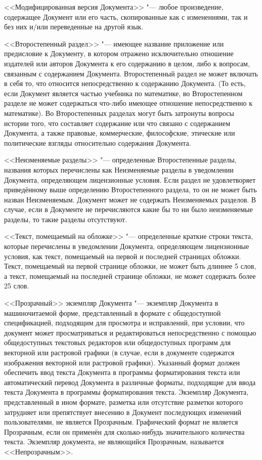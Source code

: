 <<Модифицированная версия Документа>> "--- любое произведение, содержащее
Документ или его часть, скопированные как с изменениями, так и без них
и/или переведенные на другой язык.

<<Второстепенный раздел>> "--- имеющее название приложение или предисловие
к Документу, в котором отражено исключительно отношение издателей или
авторов Документа к его содержанию в целом, либо к вопросам, связанным с
содержанием Документа. Второстепенный раздел не может включать в себя то,
что относится непосредственно к содержанию Документа. (То есть, если
Документ является частью учебника по математике, во Второстепенном
разделе не может содержаться что-либо имеющее отношение непосредственно
к математике). Во Второстепенных разделах могут быть затронуты вопросы
истории того, что составляет содержание или что связано с содержанием
Документа, а также правовые, коммерческие, философские, этические или
политические взгляды относительно содержания Документа.

<<Неизменяемые разделы>> "--- определенные Второстепенные разделы,
названия которых перечислены как Неизменяемые разделы в уведомлении
Документа, определяющем лицензионные условия. Если раздел не
удовлетворяет приведённому выше определению Второстепенного раздела, то
он не может быть назван Неизменяемым. Документ может не содержать
Неизменяемых разделов. В случае, если в Документе не перечисляются какие
бы то ни было неизменяемые разделы, то такие разделы отсутствуют.

<<Текст, помещаемый на обложке>> "--- определенные краткие строки текста,
которые перечислены в уведомлении Документа, определяющем лицензионные
условия, как текст, помещаемый на первой и последней страницах обложки.
Текст, помещаемый на первой странице обложки, не может быть длиннее 5
слов, а текст, помещаемый на последней странице обложки, не может
содержать более 25 слов.

<<Прозрачный>> экземпляр Документа "--- экземпляр Документа в
машиночитаемой форме, представленный в формате с общедоступной
спецификацией, подходящим для просмотра и исправлений, при условии, что
документ может просматриваться и редактироваться непосредственно с
помощью общедоступных текстовых редакторов или общедоступных программ
для векторной или растровой графики (в случае, если в документе
содержатся изображения векторной или растровой графики). Указанный
формат должен обеспечить ввод текста Документа в программы форматирования
текста или автоматический перевод Документа в различные форматы,
подходящие для ввода текста Документа в программы форматирования текста.
Экземпляр Документа, представленный в ином формате, разметка или
отсутствие разметки которого затрудняет или препятствует внесению в
Документ последующих изменений пользователями, не является Прозрачным.
Графический формат не является Прозрачным, если он применён для
сколько-нибудь значительного количества текста. Экземпляр документа, не
являющийся Прозрачным, называется <<Непрозрачным>>.

